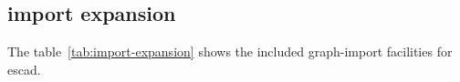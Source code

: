 \documentclass[a4paper, 12pt, openany]{scrbook}
\begin{document}
\subsection{import expansion}
The table~\ref{tab:import-expansion} shows the included graph-import facilities for escad.
\end{document}
